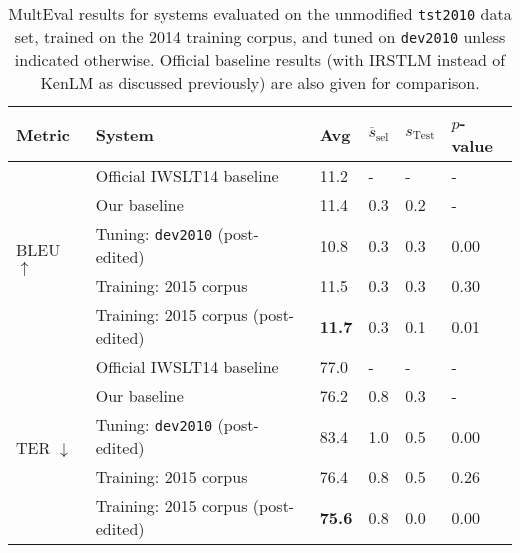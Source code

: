 {%

















\begin{table}[htb]
\begin{center}
\begin{tabular}{|l|l|l|l|l|l|}
\hline
\bf Metric & \bf System & \bf Avg & \bf $\overline{s}_{\text{sel}}$ & \bf $s_{\text{Test}}$ & \bf $p$-value \\
\hline
\multirow{5}{*}{BLEU $\uparrow$}
& Official IWSLT14 baseline  & 11.2 & -   & -   & - \\
& Our baseline & 11.4 & 0.3 & 0.2 & - \\
& Tuning: {\small \tt dev2010} (post-edited) & 10.8 & 0.3 & 0.3 & 0.00 \\
& Training: 2015 corpus & 11.5 & 0.3 & 0.3 & 0.30 \\
& Training: 2015 corpus (post-edited) & \textbf{11.7} & 0.3 & 0.1 & 0.01 \\
\hline
\multirow{5}{*}{TER $\downarrow$}
& Official IWSLT14 baseline & 77.0 & -   & -   & - \\
& Our baseline & 76.2 & 0.8 & 0.3 & - \\
& Tuning: {\small \tt dev2010} (post-edited) & 83.4 & 1.0 & 0.5 & 0.00 \\
& Training: 2015 corpus & 76.4 & 0.8 & 0.5 & 0.26 \\
& Training: 2015 corpus (post-edited) & \textbf{75.6} & 0.8 & 0.0 & 0.00 \\
\hline
\end{tabular}
\end{center}

\caption{\label{tab:multeval_tst2010} %
MultEval results for systems evaluated on the unmodified {\small \tt tst2010} data set, trained on the 2014 training corpus, and tuned on {\small \tt dev2010} unless indicated otherwise.
Official baseline results (with IRSTLM instead of KenLM as discussed previously) are also given for comparison.
} %
\end{table}

}
